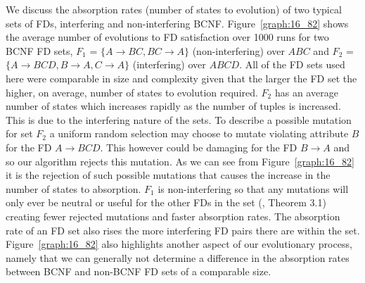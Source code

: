 We discuss the absorption rates (number of states to
evolution) of two typical sets of FDs, 
interfering and non-interfering BCNF. Figure~\ref{graph:16_82}
shows the average number of evolutions to FD satisfaction over 1000 runs for
two BCNF FD sets, $F_1$ = $\{ A \to BC, BC \to A \}$ (non-interfering)
over $ABC$ and 
$F_2$ = $\{ A \to BCD, B \to A, C \to A \}$ (interfering) over $ABCD$.
  All of the
FD sets used here were comparable in size and complexity given that the larger
the FD set the higher, on average, number of states to evolution required.
$F_2$ has an average number of states which increases
rapidly as the number of tuples is increased. This is due to the
interfering nature of the sets. To describe a possible mutation
for set $F_2$ a uniform random selection may choose to mutate violating
attribute $B$ for the FD $A \to BCD$. This however could be damaging for
the FD $B \to A$ and so our algorithm rejects this mutation. As we
can see from Figure~\ref{graph:16_82} it is the rejection of such
possible mutations that causes the increase in the number of states
to absorption. $F_1$ is non-interfering so that
any mutations will only ever be neutral or useful for the other FDs in the set 
(\cite{cl96}, Theorem 3.1) creating fewer rejected mutations
and faster absorption rates. The absorption rate of an FD set also
rises the more interfering FD pairs there are within
the set.
Figure~\ref{graph:16_82}  also highlights another
aspect of our evolutionary process, namely that we can generally not determine
 a difference in the 
absorption rates between BCNF and non-BCNF FD sets of a comparable
size. \\

